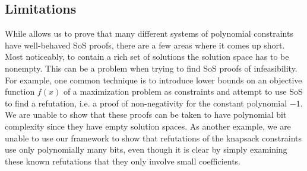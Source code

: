 \subsection{Limitations}
While  allows us to prove that many different systems of polynomial constraints have well-behaved SoS proofs, there are a few areas where it comes up short. Most noticeably, to contain a rich set of solutions the solution space has to be nonempty. This can be a problem when trying to find SoS proofs of infeasibility. For example, one common technique is to introduce lower bounds on an objective function $f(x)$ of a maximization problem as constraints and attempt to use SoS to find a refutation, i.e. a proof of non-negativity for the constant polynomial $-1$. We are unable to show that these proofs can be taken to have polynomial bit complexity since they have empty solution spaces. As another example, we are unable to use our framework to show that refutations of the knapsack constraints use only polynomially many bits, even though it is clear by simply examining these known refutations that they only involve small coefficients. 